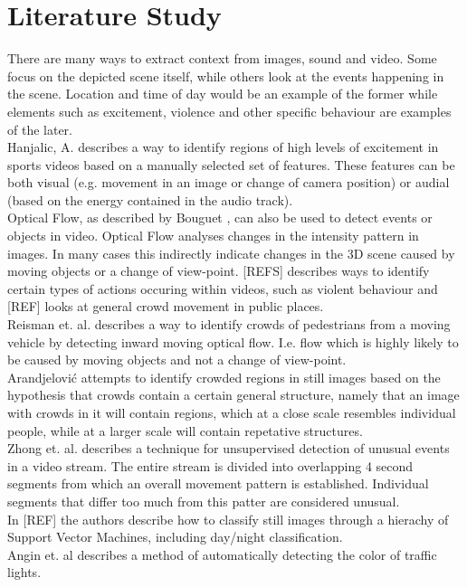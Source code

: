 \section{Literature Study}
%
There are many ways to extract context from images, sound and video. Some focus on the depicted scene itself, while others look at the events happening in the scene. Location and time of day would be an example of the former while elements such as excitement, violence and other specific behaviour are examples of the later.\\
Hanjalic, A. \cite{citeulike:405480} describes a way to identify regions of high levels of excitement in sports videos based on a manually selected set of features. These features can be both visual (e.g. movement in an image or change of camera position) or audial (based on the energy contained in the audio track).\\
Optical Flow, as described by Bouguet \cite{Bouguet2000}, can also be used to detect events or objects in video. Optical Flow analyses changes in the intensity pattern in images. In many cases this indirectly indicate changes in the 3D scene caused by moving objects or a change of view-point. [REFS] describes ways to identify certain types of actions occuring within videos, such as violent behaviour and [REF] looks at general crowd movement in public places.\\
Reisman et. al. \cite{CrowdDetectionInVideoSequences} describes a way to identify crowds of pedestrians from a moving vehicle by detecting inward moving optical flow. I.e. flow which is highly likely to be caused by moving objects and not a change of view-point.\\
Arandjelović \cite{Arandjelovic08crowddetection} attempts to identify crowded regions in still images based on the hypothesis that crowds contain a certain general structure, namely that an image with crowds in it will contain regions, which at a close scale resembles individual people, while at a larger scale will contain repetative structures.\\
Zhong et. al. \cite{10.1109/CVPR.2004.78} describes a technique for unsupervised detection of unusual events in a video stream. The entire stream is divided into overlapping 4 second segments from which an overall movement pattern is established. Individual segments that differ too much from this patter are considered unusual.\\
In [REF] the authors describe how to classify still images through a hierachy of Support Vector Machines, including day/night classification.\\
Angin et. al \cite{10.1109/MDM.2010.71} describes a method of automatically detecting the color of traffic lights. %
%
